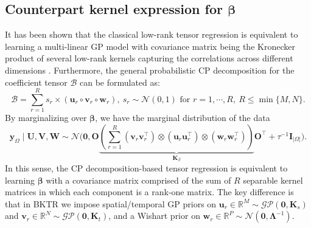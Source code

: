 \documentclass[12pt]{article}
\newcommand{\bd}[1]{\boldsymbol{#1}}
\begin{document}




\subsection{Counterpart kernel expression for $\boldsymbol{\beta}$}

It has been shown that the classical low-rank tensor regression is equivalent to learning a multi-linear GP model with covariance matrix being the Kronecker product of several low-rank kernels capturing the correlations across different dimensions \citep{chu2009probabilistic,yu2018tensor}. Furthermore, the general probabilistic CP decomposition for the coefficient tensor $\boldsymbol{\mathcal{B}}$ can be formulated as:
\begin{equation}
    \boldsymbol{\mathcal{B}}=\sum_{r=1}^{R}s_r\times\left( \boldsymbol{u}_{r}\circ\boldsymbol{v}_{r}\circ\boldsymbol{w}_{r}\right),  \ s_r\sim \mathcal{N}\left(0,1\right) \text{ for } r=1,\cdots,R, \ R\le \min \{M,N\}.
\end{equation} %
By marginalizing over $\boldsymbol{\beta}$, we have the marginal distribution of the data 
\begin{equation}\label{eq:GPCP}
    \boldsymbol{y}_\Omega \;|\; \bd{U},\bd{V},\bd{W} \sim  \mathcal{N}\Big(\boldsymbol{0},\boldsymbol{O}\underbrace{\left(\sum_{r=1}^R\left(\boldsymbol{v}_{r}\boldsymbol{v}_{r}^{\top}\right)\otimes\left(\boldsymbol{u}_{r}\boldsymbol{u}_{r}^{\top}\right)\otimes\left(\boldsymbol{w}_{r}\boldsymbol{w}_{r}^{\top}\right)\right)}_{\boldsymbol{K}_{\beta}}\boldsymbol{O}^{\top}+\tau^{-1}\boldsymbol{I}_{|\Omega|}\Big).
\end{equation}
In this sense, the CP decomposition-based tensor regression is equivalent to learning $\boldsymbol{\beta}$ with a covariance matrix comprised of the sum of $R$ separable kernel matrices in which each component is a rank-one matrix. The key difference is that in BKTR we impose spatial/temporal GP priors on $\boldsymbol{u}_{r}\in\mathbb{R}^{M}\sim\mathcal{GP}(\boldsymbol{0},\boldsymbol{K}_{s})$ and  $\boldsymbol{v}_{r}\in\mathbb{R}^{N}\sim\mathcal{GP}(\boldsymbol{0},\boldsymbol{K}_{t})$, and a Wishart prior on  $\boldsymbol{w}_{r}\in\mathbb{R}^{P}\sim\mathcal{N}(\boldsymbol{0},\boldsymbol{\Lambda}^{-1})$.
\end{document}
